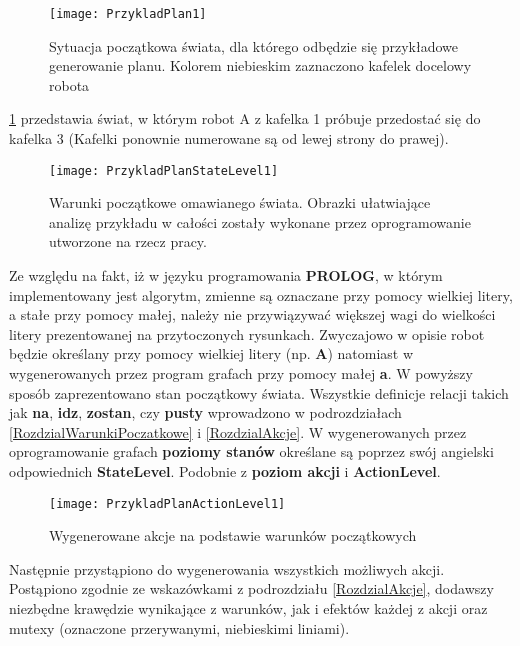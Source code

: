    \begin{figure}[H]
        \texttt{[image: PrzykladPlan1]}
        \centering
        \caption{Sytuacja początkowa świata, dla którego odbędzie się przykładowe generowanie planu. Kolorem niebieskim zaznaczono kafelek docelowy robota}
        \label{PrzykladPlan1}
    \end{figure}

    \ref{PrzykladPlan1} przedstawia świat, w którym robot A z kafelka 1 próbuje przedostać się do kafelka 3 (Kafelki ponownie numerowane są od lewej strony
    do prawej).

    \begin{figure}[H]
        \texttt{[image: PrzykladPlanStateLevel1]}
        \centering
        \caption{Warunki początkowe omawianego świata. Obrazki ułatwiające analizę przykładu w całości zostały 
        wykonane przez oprogramowanie utworzone na rzecz pracy. }
        \label{PrzykladPlanWP}
    \end{figure}

    Ze względu na fakt, iż w języku programowania \textbf{PROLOG}, w którym implementowany jest algorytm, zmienne są oznaczane przy pomocy wielkiej litery,
    a stałe przy pomocy małej, należy nie przywiązywać większej wagi do wielkości litery prezentowanej na przytoczonych rysunkach. 
    Zwyczajowo w opisie robot będzie określany przy pomocy wielkiej litery (np. \textbf{A}) natomiast 
    w wygenerowanych przez program grafach przy pomocy małej \textbf{a}.
    W powyższy sposób zaprezentowano stan początkowy świata. Wszystkie definicje relacji takich jak \textbf{na}, \textbf{idz}, \textbf{zostan}, czy 
    \textbf{pusty} wprowadzono w podrozdziałach \ref{RozdzialWarunkiPoczatkowe} i \ref{RozdzialAkcje}. W wygenerowanych przez oprogramowanie grafach \textbf{poziomy stanów}
    określane są poprzez swój angielski odpowiednich \textbf{StateLevel}. Podobnie z \textbf{poziom akcji} i \textbf{ActionLevel}. 

    \begin{figure}[H]
        \texttt{[image: PrzykladPlanActionLevel1]}
        \centering
        \caption{Wygenerowane akcje na podstawie warunków początkowych}
        \label{PrzykladPlanAP1}
    \end{figure}

    Następnie przystąpiono do wygenerowania wszystkich możliwych akcji. Postąpiono zgodnie ze wskazówkami z podrozdziału \ref{RozdzialAkcje}, 
    dodawszy niezbędne krawędzie wynikające z warunków, jak i efektów każdej z akcji oraz mutexy (oznaczone przerywanymi, niebieskimi liniami).

